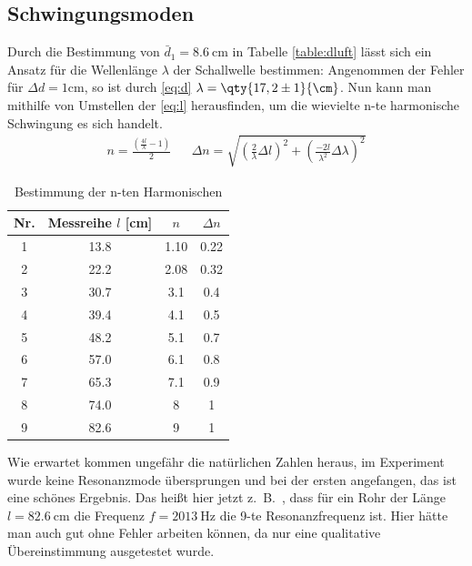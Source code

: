 \subsection{Schwingungsmoden}
Durch die Bestimmung von \(\bar{d}_1=\qty{8,6}{\cm}\) in Tabelle \cref{table:dluft} lässt sich ein Ansatz für die Wellenlänge \(\lambda\)
der Schallwelle bestimmen: Angenommen der Fehler für \(\Delta d=1\)cm, so ist durch \cref{eq:d} \(\lambda=\qty{17,2\pm1}{\cm}\). Nun kann man mithilfe von Umstellen der \cref{eq:l}
herausfinden, um die wievielte n-te harmonische Schwingung es sich handelt.
\begin{align}
    n=\frac{\left(\frac{4l}{\lambda}-1\right)}{2}&&\Delta n=\sqrt{\left(\frac{2}{\lambda}\Delta l\right)^{2}+\left(\frac{-2l}{\lambda^{2}}\Delta \lambda\right)^{2}}
\end{align}

\begin{table}[htbp]
\centering
\begin{tabular*}{0.6\textwidth}{c @{\extracolsep{\fill}} S[table-format=2.1] S[table-format=1.2] S[table-format=1.2] }
\toprule
Nr. & {Messreihe $l$ [\unit{\cm}]} & { $n$ } & { $\Delta n$ } \\
 & 13.8    &    1.10     & 0.22\\
2 & 22.2    &     2.08   &  0.32\\
3 & 30.7    &     3.1    & 0.4 \\
4 & 39.4    &      4.1   & 0.5 \\
5 & 48.2    &      5.1   & 0.7\\
6 & 57.0      &      6.1  & 0.8\\
7 & 65.3    &      7.1  & 0.9\\
8 & 74.0      &     8   & 1 \\
9 & 82.6    &      9   &1 \\
\bottomrule
\end{tabular*}
\caption{Bestimmung der n-ten Harmonischen}
\label{table:Mode}
\end{table}

Wie erwartet kommen ungefähr die natürlichen Zahlen heraus, im Experiment wurde keine Resonanzmode übersprungen und bei der ersten angefangen, das ist eine schönes Ergebnis. Das heißt hier jetzt z.\ B.\ , dass für ein Rohr der Länge \(l=\qty{82,6}{\cm}\) die Frequenz \(f=\qty{2013}{\hertz}\) die 9-te Resonanzfrequenz ist. Hier hätte man auch gut ohne Fehler arbeiten können, da nur eine qualitative Übereinstimmung ausgetestet wurde.
\newpage
